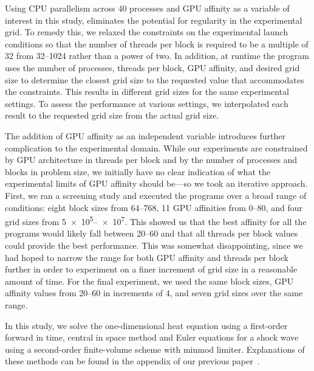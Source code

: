 Using CPU parallelism across 40 processes and GPU affinity as a variable of interest in this study, eliminates the potential for regularity in the experimental grid.
To remedy this, we relaxed the constraints on the experimental launch conditions so that the number of
threads per block is required to be a multiple of 32 from \numrange{32}{1024} rather than a power of two.
In addition, at runtime the program uses the number of processes, threads per block, GPU affinity,
and desired grid size to determine the closest grid size to the requested value that accommodates the constraints.
This results in different grid sizes for the same experimental settings.
To assess the performance at various settings, we interpolated each result to the requested grid size
from the actual grid size.

The addition of GPU affinity as an independent variable introduces further complication to the experimental domain.
While our experiments are constrained by GPU architecture in threads per block and by the number
of processes and blocks in problem size, we initially have no clear indication of what the
experimental limits of GPU affinity should be---so we took an iterative approach.
First, we ran a screening study and executed the programs over a broad range of conditions:
eight block sizes from \numrange{64}{768}, 11 GPU affinities from \numrange{0}{80}, and
four grid sizes from \numrange{5e5}{e7}.
This showed us that the best affinity for all the programs would likely fall between \numrange{20}{60}
and that all threads per block values could provide the best performance.
This was somewhat disappointing, since we had hoped to narrow the range for both GPU affinity and
threads per block further in order to experiment on a finer increment of grid size in a reasonable amount of time.
For the final experiment, we used the same block sizes, GPU affinity values from \numrange{20}{60}
in increments of 4, and seven grid sizes over the same range.

In this study, we solve the one-dimensional heat equation using a first-order forward in time, central in space
method and Euler equations for a shock wave using a second-order finite-volume scheme with minmod limiter.
Explanations of these methods can be found in the appendix of our previous paper~\cite{OurJCP}.